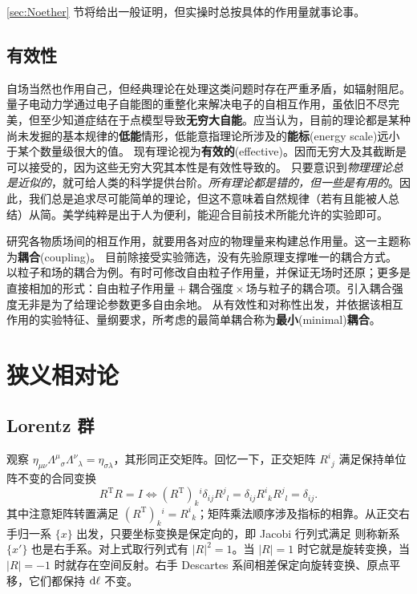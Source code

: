 \ref{sec:Noether} 节将给出一般证明，但实操时总按具体的作用量就事论事。

\subsection{有效性}

自场当然也作用自己，但经典理论在处理这类问题时存在严重矛盾，如辐射阻尼。量子电动力学通过电子自能图的重整化来解决电子的自相互作用，虽依旧不尽完美，但至少知道症结在于点模型导致\textbf{无穷大自能}。应当认为，目前的理论都是某种尚未发掘的基本规律的\textbf{低能}情形，低能意指理论所涉及的\textbf{能标}(energy scale)远小于某个数量级很大的值。
现有理论视为\textbf{有效的}(effective)。因而无穷大及其截断是可以接受的，因为这些无穷大究其本性是有效性导致的。
只要意识到\textit{物理理论总是近似的}，就可给人类的科学提供台阶。\textit{所有理论都是错的，但一些是有用的}。因此，我们总是追求尽可能简单的理论，但这不意味着自然规律（若有且能被人总结）从简。美学纯粹是出于人为便利，能迎合目前技术所能允许的实验即可。

研究各物质场间的相互作用，就要用各对应的物理量来构建总作用量。这一主题称为\textbf{耦合}(coupling)。
目前除接受实验筛选，没有先验原理支撑唯一的耦合方式。
以粒子和场的耦合为例。有时可修改自由粒子作用量，并保证无场时还原；更多是直接相加的形式：$\text{自由粒子作用量}+\textbf{耦合强度}\times\text{场与粒子的耦合项}$。引入耦合强度无非是为了给理论参数更多自由余地。
从有效性和对称性出发，并依据该相互作用的实验特征、量纲要求，所考虑的最简单耦合称为\textbf{最小}(minimal)\textbf{耦合}。

\section{狭义相对论}
\subsection{Lorentz 群}
观察 $\eta_{\mu\nu}\Lambda^{\mu}{}_{\sigma}{\Lambda^{\nu}}_{\lambda}={\eta}_{\sigma\lambda}$，其形同正交矩阵。回忆一下，正交矩阵 $R^i{}_j$ 满足保持单位阵不变的合同变换
\[
    R^\mathrm{T} R = I\iff (R^\mathrm{T})_k{}^i\delta_{ij} R^j{}_l=\delta_{ij}R^i{}_k R^j{}_l=\delta_{ij}.
\]
其中注意矩阵转置满足 $(R^\mathrm{T})_k{}^i=R^i{}_k$；矩阵乘法顺序涉及指标的相靠。从正交右手归一系 $\{x\}$ 出发，只要坐标变换是保定向的，即 Jacobi 行列式满足
则称新系 $\{x'\}$ 也是右手系。对上式取行列式有  $|R|^2=1$。当 $|R|=1$ 时它就是旋转变换，当 $|R|=-1$ 时就存在空间反射。右手 Descartes 系间相差保定向旋转变换、原点平移，它们都保持 $\dd\ell$ 不变。

